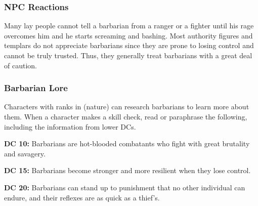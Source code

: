\subsubsection{NPC Reactions}
Many lay people cannot tell a barbarian from a ranger or a fighter until his rage overcomes him and he starts screaming and bashing. Most authority figures and templars do not appreciate barbarians since they are prone to losing control and cannot be truly trusted. Thus, they generally treat barbarians with a great deal of caution.

\subsubsection{Barbarian Lore}
Characters with ranks in  (nature) can research barbarians to learn more about them. When a character makes a skill check, read or paraphrase the following, including the information from lower DCs.

\textbf{DC 10:} Barbarians are hot-blooded combatants who fight with great brutality and savagery.

\textbf{DC 15:} Barbarians become stronger and more resilient when they lose control.

\textbf{DC 20:} Barbarians can stand up to punishment that no other individual can endure, and their reflexes are as quick as a thief's.
